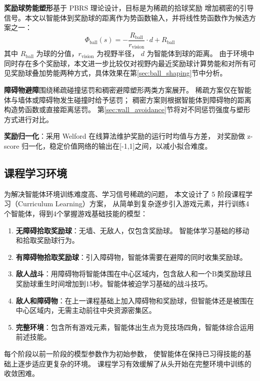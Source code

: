\documentclass[12pt, a4paper, UTF8]{ctexart}
\numberwithin{equation}{section}
\begin{document}
\textbf{奖励球势能塑形}基于 PBRS 理论设计，目标是为稀疏的拾球奖励
增加稠密的引导信号。本文以智能体到奖励球的距离作为势函数输入，并将线性势函数作为候选方案之一：
\begin{equation}
  \Phi_{\text{ball}}(s) = -\frac{R_{\text{ball}}}{r_{\text{vision}}} \cdot d + R_{\text{ball}}
  \label{eq:ball_potential}
\end{equation}
其中 $R_{\text{ball}}$ 为球的分值，$r_{\text{vision}}$ 为视野半径，
$d$ 为智能体到球的距离。
由于环境中同时存在多个奖励球，本文进一步比较仅对视野内最近奖励球计算势能和对所有可见奖励球叠加势能两种方式，具体效果在第\ref{sec:ball_shaping}节中分析。

\textbf{障碍物避障}围绕稀疏碰撞惩罚和稠密避障塑形两类方案展开。
稀疏方案仅在智能体与墙体或障碍物发生碰撞时给予惩罚；
稠密方案则根据智能体到障碍物的距离构造势函数或直接距离惩罚。
第\ref{sec:wall_avoidance}节将对不同惩罚强度与塑形方式进行对比。

\textbf{奖励归一化}：采用 Welford 在线算法维护奖励的运行时均值与方差，
对奖励做 z-score 归一化，稳定价值网络的输出在[-1,1]之间，以减小拟合难度。

\subsection{课程学习环境}
为解决智能体环境训练难度高、学习信号稀疏的问题，
本文设计了 5 阶段课程学习（Curriculum Learning）方案，
从简单到复杂逐步引入游戏元素，并行训练4个智能体，得到4个掌握游戏基础技能的模型：

\begin{enumerate}[label=阶段\arabic*：, leftmargin=*]
  \item \textbf{无障碍拾取奖励球}：无墙、无敌人，仅包含奖励球。
  智能体学习基础的移动和拾取奖励球行为。
  \item \textbf{有障碍物拾取奖励球}：引入障碍物，智能体需要在避障的同时收集奖励球。
  \item \textbf{敌人战斗}：用障碍物将智能体围在中心区域内，包含敌人和一个B类奖励球且奖励球重生时间增加到15秒。智能体被迫学习基础的战斗技巧。
  \item \textbf{敌人和障碍物}：在上一课程基础上加入障碍物和奖励球，但智能体还是被围在中心区域内，无需主动前往中央资源密集区。
  \item \textbf{完整环境}：包含所有游戏元素，智能体出生点为竞技场四角，智能体综合运用前述技能。
\end{enumerate}

每个阶段以前一阶段的模型参数作为初始参数，
使智能体在保持已习得技能的基础上逐步适应更复杂的环境。
课程学习有效缓解了从头开始在完整环境中训练的收敛困难。
\end{document}
